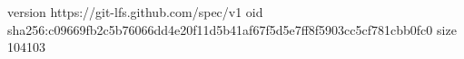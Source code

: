 version https://git-lfs.github.com/spec/v1
oid sha256:c09669fb2c5b76066dd4e20f11d5b41af67f5d5e7ff8f5903cc5cf781cbb0fc0
size 104103
